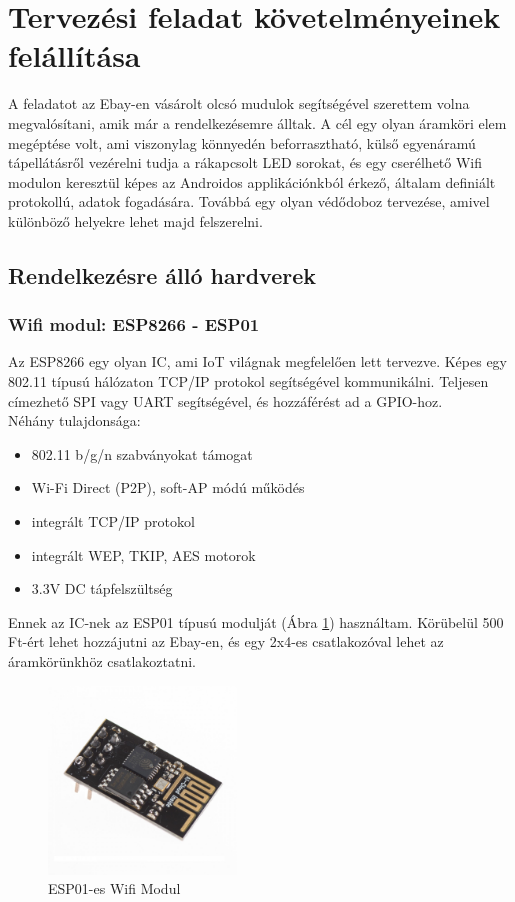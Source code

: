 \documentclass[../main.tex]{subfiles}
\begin{document}
\section{Tervezési feladat követelményeinek felállítása}
    A feladatot az Ebay-en vásárolt olcsó mudulok segítségével szerettem volna megvalósítani, amik már a rendelkezésemre álltak. A cél egy olyan áramköri elem megéptése volt, ami viszonylag könnyedén beforrasztható, külső egyenáramú tápellátásről vezérelni tudja a rákapcsolt LED sorokat, és egy cserélhető Wifi modulon keresztül képes az Androidos applikációnkból érkező, általam definiált protokollú, adatok fogadására. Továbbá egy olyan védődoboz tervezése, amivel különböző helyekre lehet majd felszerelni.
    
    \subsection{Rendelkezésre álló hardverek}
        \subsubsection{Wifi modul: ESP8266 - ESP01} %
            Az ESP8266 egy olyan IC, ami IoT világnak megfelelően lett tervezve. Képes egy 802.11 típusú hálózaton TCP/IP protokol segítségével kommunikálni. Teljesen címezhető SPI vagy UART segítségével, és hozzáférést ad a GPIO-hoz.\\[12px]
            Néhány tulajdonsága:
            \begin{itemize}
                \item 802.11 b/g/n szabványokat támogat
                \item Wi-Fi Direct (P2P), soft-AP módú működés
                \item integrált TCP/IP protokol
                \item integrált WEP, TKIP, AES motorok
                \item 3.3V DC tápfelszültség
            \end{itemize}
            
            Ennek az IC-nek az ESP01 típusú modulját (Ábra \ref{fig:esp01}) használtam. Körübelül 500 Ft-ért lehet hozzájutni az Ebay-en, és egy 2x4-es csatlakozóval lehet az áramkörünkhöz csatlakoztatni.
            
            \begin{figure}[h!]
                \centering
                    \includegraphics[width=5cm]{resources/pcb_res/esp01.jpg}
                \caption{ESP01-es Wifi Modul}
                \label{fig:esp01}
            \end{figure}
        
\end{document}
